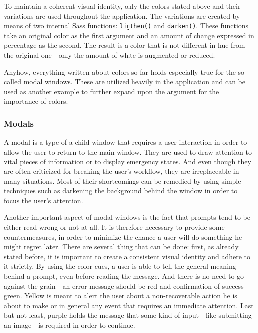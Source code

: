\documentclass[thesis=M,english,hidelinks]{FITthesis}[2012/10/20]
\newcommand{\code}{\texttt}
\begin{document}
To maintain a coherent visual identity, only the colors stated above and their variations are used throughout the application. The variations are created by means of two internal Sass functions: \code{ligthen()} and \code{darken()}. These functions take an original color as the first argument and an amount of change expressed in percentage as the second. The result is a color that is not different in hue from the original one---only the amount of white is augmented or reduced.

Anyhow, everything written about colors so far holds especially true for the so called modal windows. These are utilized heavily in the application and can be used as another example to further expand upon the argument for the importance of colors.

    \subsubsection{Modals}

A modal is a type of a child window that requires a user interaction in order to allow the user to return to the main window. They are used to draw attention to vital pieces of information or to display emergency states. And even though they are often criticized for breaking the user's workflow, they are irreplaceable in many situations. Most of their shortcomings can be remedied by using simple techniques such as darkening the background behind the window in order to focus the user's attention.

Another important aspect of modal windows is the fact that prompts tend to be either read wrong or not at all. It is therefore necessary to provide some countermeasures, in order to minimize the chance a user will do something he might regret later. There are several thing that can be done: first, as already stated before, it is important to create a consistent visual identity and adhere to it strictly. By using the color cues, a user is able to tell the general meaning behind a prompt, even before reading the message. And there is no need to go against the grain---an error message should be red and confirmation of success green. Yellow is meant to alert the user about a non-recoverable action he is about to make or in general any event that requires an immediate attention. Last but not least, purple holds the message that some kind of input---like submitting an image---is required in order to continue.
\end{document}
